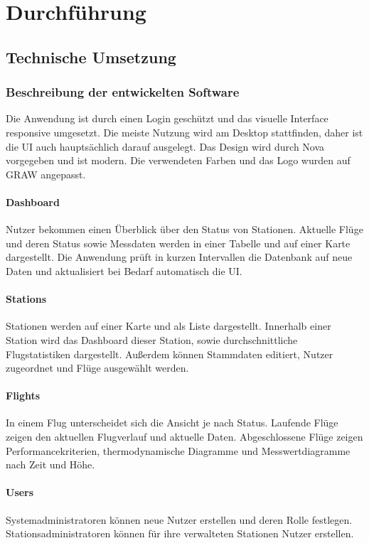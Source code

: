 \section{Durchführung}

\subsection{Technische Umsetzung}

\subsubsection{Beschreibung der entwickelten Software}

Die Anwendung ist durch einen Login geschützt und das visuelle Interface responsive umgesetzt.
Die meiste Nutzung wird am Desktop stattfinden, daher ist die UI auch hauptsächlich darauf ausgelegt.
Das Design wird durch Nova vorgegeben und ist modern.
Die verwendeten Farben und das Logo wurden auf GRAW angepasst.

\paragraph{Dashboard}
Nutzer bekommen einen Überblick über den Status von Stationen.
Aktuelle Flüge und deren Status sowie Messdaten werden in einer Tabelle und auf einer Karte dargestellt.
Die Anwendung prüft in kurzen Intervallen die Datenbank auf neue Daten und aktualisiert bei Bedarf automatisch die UI.

\paragraph{Stations}
Stationen werden auf einer Karte und als Liste dargestellt.
Innerhalb einer Station wird das Dashboard dieser Station, sowie durchschnittliche Flugstatistiken dargestellt.
Außerdem können Stammdaten editiert, Nutzer zugeordnet und Flüge ausgewählt werden.

\paragraph{Flights}
In einem Flug unterscheidet sich die Ansicht je nach Status.
Laufende Flüge zeigen den aktuellen Flugverlauf und aktuelle Daten.
Abgeschlossene Flüge zeigen Performancekriterien, thermodynamische Diagramme und Messwertdiagramme nach Zeit und Höhe.

\paragraph{Users}
Systemadministratoren können neue Nutzer erstellen und deren Rolle festlegen.
Stationsadministratoren können für ihre verwalteten Stationen Nutzer erstellen.

